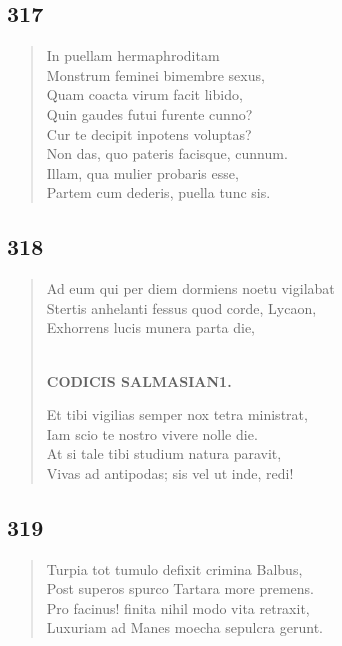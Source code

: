 \documentclass[11pt, a4paper]{report}
\begin{document}
            \subsection*{317}
      \begin{verse}
      In puellam hermaphroditam \\ Monstrum feminei bimembre sexus, \\ Quam coacta virum facit libido, \\ Quin gaudes futui furente cunno? \\ Cur te decipit inpotens voluptas? \\ Non das, quo pateris facisque, cunnum. \\ Illam, qua mulier probaris esse, \\ Partem cum dederis, puella tunc sis. \\ 
      \end{verse}
  
            \subsection*{318}
      \begin{verse}
      Ad eum qui per diem dormiens noetu vigilabat \\ Stertis anhelanti fessus quod corde, Lycaon, \\ Exhorrens lucis munera parta die, \\ 
        ﻿\pagebreak 
    \begin{center} \textbf{CODICIS SALMASIAN1.} \end{center} \marginpar{[263]} Et tibi vigilias semper nox tetra ministrat, \\ Iam scio te nostro vivere nolle die. \\ At si tale tibi studium natura paravit, \\ Vivas ad antipodas; sis vel ut inde, redi! \\ 
      \end{verse}
  
            \subsection*{319}
      \begin{verse}
      Turpia tot tumulo defixit crimina Balbus, \\ Post superos spurco Tartara more premens. \\ Pro facinus! finita nihil modo vita retraxit, \\ Luxuriam ad Manes moecha sepulcra gerunt. \\ 
      \end{verse}
  
\end{document}

